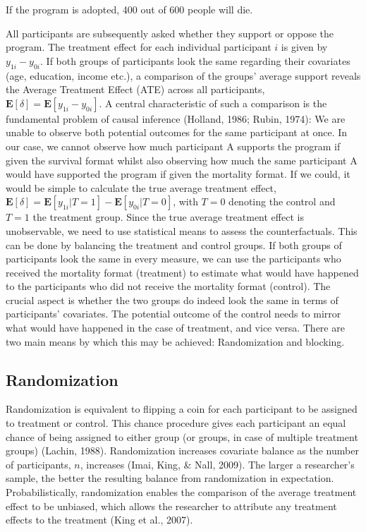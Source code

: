 \documentclass[12pt,econ]{sources/authesis}
\begin{document}
\vspace{0.3cm}
\begin{adjustwidth}{50pt}{50pt}
\ssp
\noindent If the program is adopted, 400 out of 600 people will die.
\end{adjustwidth}
All participants are subsequently asked whether they support or oppose the program. The treatment effect for each individual participant \(i\) is given by \(y_{1i} - y_{0i}\). If both groups of participants look the same regarding their covariates (age, education, income etc.), a comparison of the groups' average support reveals the Average Treatment Effect (ATE) across all participants, \(\mathbf{E}[\delta] = \mathbf{E}[y_{1i} - y_{0i}]\). A central characteristic of such a comparison is the fundamental problem of causal inference (Holland, 1986; Rubin, 1974): We are unable to observe both potential outcomes for the same participant at once. In our case, we cannot observe how much participant A supports the program if given the survival format whilst also observing how much the same participant A would have supported the program if given the mortality format. If we could, it would be simple to calculate the true average treatment effect, \(\mathbf{E}[\delta] = \mathbf{E}[y_{1i}|T=1] - \mathbf{E}[y_{0i}|T=0]\), with \(T=0\) denoting the control and \(T=1\) the treatment group. Since the true average treatment effect is unobservable, we need to use statistical means to assess the counterfactuals. This can be done by balancing the treatment and control groups. If both groups of participants look the same in every measure, we can use the participants who received the mortality format (treatment) to estimate what would have happened to the participants who did not receive the mortality format (control). The crucial aspect is whether the two groups do indeed look the same in terms of participants' covariates. The potential outcome of the control needs to mirror what would have happened in the case of treatment, and vice versa. There are two main means by which this may be achieved: Randomization and blocking.

\hypertarget{ordblock-theory-randomization}{%
\subsection{Randomization}\label{ordblock-theory-randomization}}

Randomization is equivalent to flipping a coin for each participant to be assigned to treatment or control. This chance procedure gives each participant an equal chance of being assigned to either group (or groups, in case of multiple treatment groups) (Lachin, 1988). Randomization increases covariate balance as the number of participants, \(n\), increases (Imai, King, \& Nall, 2009). The larger a researcher's sample, the better the resulting balance from randomization in expectation. Probabilistically, randomization enables the comparison of the average treatment effect to be unbiased, which allows the researcher to attribute any treatment effects to the treatment (King et al., 2007).
\end{document}
